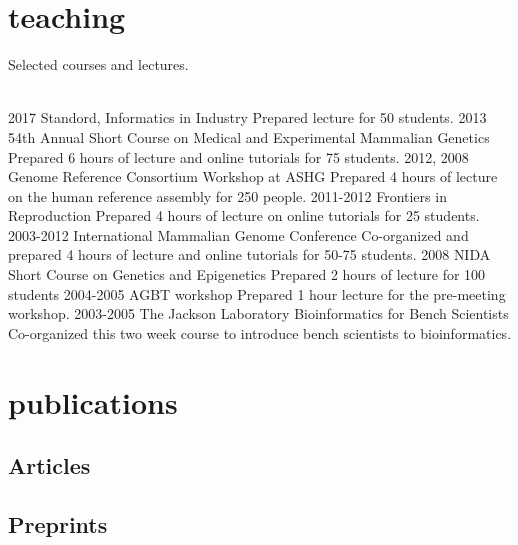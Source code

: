 \documentclass[]{dmc-cv} %
\begin{document}
\section{teaching}
Selected courses and lectures.\\
\\
\begin{entrylist}
\entry
{2017}
{Standord, Informatics in Industry}
{}
{Prepared lecture for 50 students.}
\entry
{2013}
{54th Annual Short Course on Medical and Experimental Mammalian Genetics}
{ }
{Prepared 6 hours of lecture and online tutorials for 75 students.}
\entry
{2012, 2008}
{Genome Reference Consortium Workshop at ASHG}
{ }
{Prepared 4 hours of lecture on the human reference assembly for 250 people.}
\entry
{2011-2012}
{Frontiers in Reproduction}
{ }
{Prepared 4 hours of lecture on online tutorials for 25 students.}
\entry
{2003-2012}
{International Mammalian Genome Conference}
{ }
{Co-organized and prepared 4 hours of lecture and online tutorials for 50-75 students.}
\entry
{2008}
{NIDA Short Course on Genetics and Epigenetics}
{ }
{Prepared 2 hours of lecture for 100 students }
\entry
{2004-2005}
{AGBT workshop}
{ }
{Prepared 1 hour lecture for the pre-meeting workshop.}
\entry
{2003-2005}
{The Jackson Laboratory Bioinformatics for Bench Scientists}
{ }
{Co-organized this two week course to introduce bench scientists to bioinformatics.}
\end{entrylist}


\section{publications}
\subsection{Articles}
\printbibliography[type=article, heading=none]
\nocite{*}

\subsection{Preprints}
\printbibliography[type=unpublished, heading=none]
\nocite{*}
\end{document}
